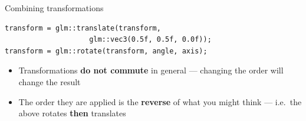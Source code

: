 \begin{frame}[fragile]{Combining transformations}
	\pause \begin{lstlisting}
transform = glm::translate(transform,
					glm::vec3(0.5f, 0.5f, 0.0f));
transform = glm::rotate(transform, angle, axis);
	\end{lstlisting}
	\begin{itemize}
		\pause\item Transformations \textbf{do not commute} in general ---
			changing the order will change the result
		\pause\item The order they are applied is the \textbf{reverse} of what you might think ---
			i.e.\ the above rotates \textbf{then} translates
	\end{itemize}
\end{frame}